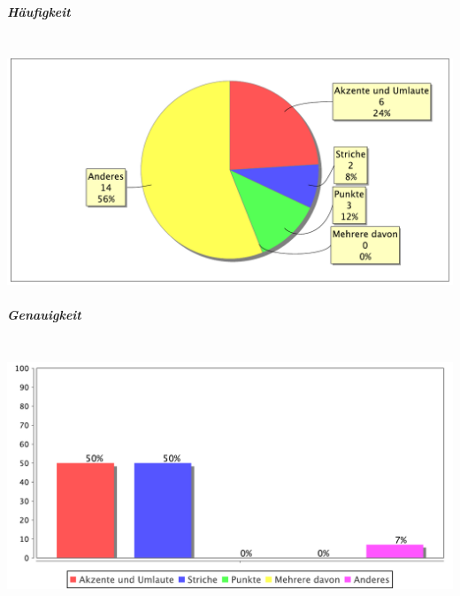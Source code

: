 \subparagraph{Häufigkeit}~\\
\includegraphics[width=\textwidth]{img/pdf/wortschatz2dbpedia.analyse.SpecialCharactersClassifier.piechart.pdf}
\subparagraph{Genauigkeit}~\\
\includegraphics[width=\textwidth]{img/pdf/wortschatz2dbpedia.analyse.SpecialCharactersClassifier.barchart.pdf}

